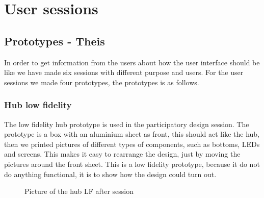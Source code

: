 \chapter{User sessions}
\section{Prototypes - Theis}
In order to get information from the users about how the user interface should be like we have made six sessions with different purpose and users. For the user sessions we made four prototypes, the prototypes is as follows.

\subsection{Hub low fidelity}
The low fidelity hub prototype is used in the participatory design session. The prototype is a box with an aluminium sheet as front, this should act like the hub, then we printed pictures of different types of components, such as bottoms, LEDs and screens. This makes it easy to rearrange the design, just by moving the pictures around the front sheet. This is a low fidelity prototype, because it do not do anything functional, it is to show how the design could turn out.
\begin{figure}[h!]
	\center
		\setlength\fboxsep{0pt}
		\setlength\fboxrule{1pt}
   	\caption{Picture of the hub LF after session}
   	\label{fig:LF hub after session}
\end{figure}

